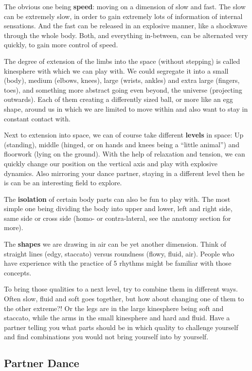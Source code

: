 The obvious one being \textbf{speed}: moving on a dimension of slow and fast.
The slow can be extremely slow, in order to gain extremely lots of information of internal sensations.
And the fast can be released in an explosive manner, like a shockwave through the whole body.
Both, and everything in-between, can be alternated very quickly, to gain more control of speed.

The degree of extension of the limbs into the space (without stepping) is called \gls{kinesphere} with which we can play with.
We could segregate it into a small (body), medium (elbows, knees), large (wrists, ankles) and extra large (fingers, toes), and something more abstract going even beyond, the universe (projecting outwards).
Each of them creating a differently sized ball, or more like an egg shape, around us in which we are limited to move within and also want to stay in constant contact with.

Next to extension into space, we can of course take different \textbf{levels} in space: Up (standing), middle (hinged, or on hands and knees being a ``little animal'') and floorwork (lying on the ground).
With the help of relaxation and tension, we can quickly change our position on the vertical axis and play with explosive dynamics.
Also mirroring your dance partner, staying in a different level then he is can be an interesting field to explore.

The \textbf{isolation} of certain body parts can also be fun to play with.
The most simple one being dividing the body into upper and lower, left and right side, same side or cross side (homo- or contra-lateral, see the anatomy section for more).

The \textbf{shapes} we are drawing in air can be yet another dimension.
Think of straight lines (edgy, staccato) versus roundness (flowy, fluid, air).
People who have experience with the practice of 5 rhythms might be familiar with those concepts.

To bring those qualities to a next level, try to combine them in different ways.
Often slow, fluid and soft goes together, but how about changing one of them to the other extreme?!
Or the legs are in the large kinesphere being soft and staccato, while the arms in the small kinesphere and hard and fluid.
Have a partner telling you what parts should be in which quality to challenge yourself and find combinations you would not bring yourself into by yourself.

\subsection{Partner Dance}\label{subsec:partner-dance}

